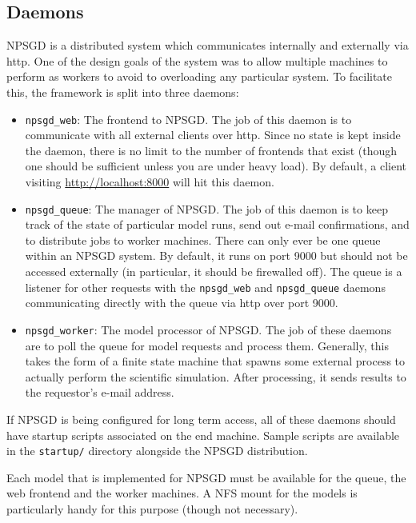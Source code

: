 \documentclass{article}
\newcommand{\mpath}[1]{\texttt{#1}}
\begin{document}
\subsection{Daemons}
NPSGD is a distributed system which communicates internally and externally via
http. One of the design goals of the system was to allow multiple machines to
perform as workers to avoid to overloading any particular system. To
facilitate this, the framework is split into three daemons:
\begin{itemize}
    \item \texttt{npsgd\_web}: The frontend to NPSGD. The job of this daemon is
    to communicate with all external clients over http. Since no state is kept
    inside the daemon, there is no limit to the number of frontends that exist (though one
    should be sufficient unless you are under heavy load). By default, a
    client visiting \url{http://localhost:8000} will hit this daemon.

    \item \texttt{npsgd\_queue}: The manager of NPSGD. The job of this daemon is
    to keep track of the state of particular model runs, send out e-mail
    confirmations, and to distribute jobs to worker machines. There can only
    ever be one queue within an NPSGD system. By default, it runs on port 9000
    but should not be accessed externally (in particular, it should be
    firewalled off). The queue is a listener for other requests with the 
    \texttt{npsgd\_web} and \texttt{npsgd\_queue} daemons communicating directly
    with the queue via http over port 9000.

    \item \texttt{npsgd\_worker}: The model processor of NPSGD. The job of these
    daemons are to poll the queue for model requests and process them.
    Generally, this takes the form of a finite state machine that spawns some
    external process to actually perform the scientific simulation. After
    processing, it sends results to the requestor's e-mail address.
\end{itemize}

If NPSGD is being configured for long term access, all of these daemons should
have startup scripts associated on the end machine. Sample scripts are available
in the \mpath{startup/} directory alongside the NPSGD distribution.

Each model that is implemented for NPSGD must be available for the queue, the
web frontend and the worker machines. A NFS mount for the models is particularly
handy for this purpose (though not necessary).
\end{document}
